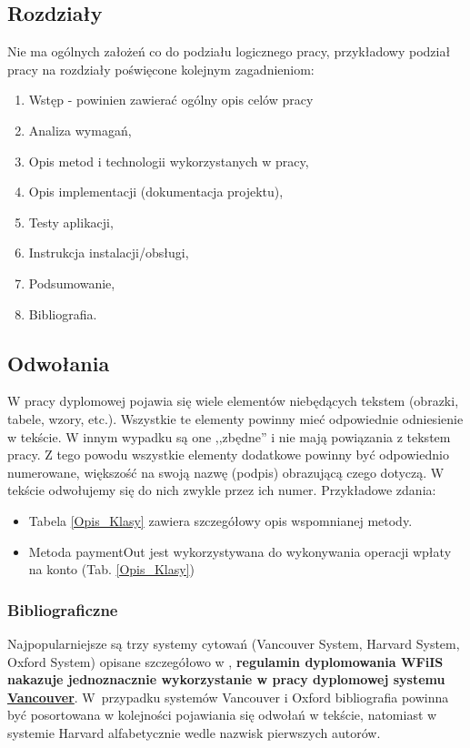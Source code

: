 \documentclass[12pt,a4paper]{article}
\begin{document}
\subsection{Rozdziały}
Nie ma ogólnych założeń co do podziału logicznego pracy, przykładowy podział pracy na rozdziały poświęcone kolejnym zagadnieniom:
\begin{enumerate}
\item Wstęp - powinien zawierać ogólny opis celów pracy
\item Analiza wymagań,
\item Opis metod i technologii wykorzystanych w pracy,
\item Opis implementacji (dokumentacja projektu),
\item Testy aplikacji,
\item Instrukcja instalacji/obsługi,
\item Podsumowanie,
\item Bibliografia.
\end{enumerate}

\subsection{Odwołania}

W pracy dyplomowej pojawia się wiele elementów niebędących tekstem (obrazki, tabele, wzory, etc.). Wszystkie te elementy powinny mieć odpowiednie odniesienie w tekście. W innym wypadku są one ,,zbędne'' i nie mają powiązania z tekstem pracy. Z tego powodu wszystkie elementy dodatkowe powinny być odpowiednio numerowane, większość na swoją nazwę (podpis) obrazującą czego dotyczą. W tekście odwołujemy się do nich zwykle przez ich numer. Przykładowe zdania: 
\begin{itemize}
\item Tabela \ref{Opis_Klasy} zawiera szczegółowy opis wspomnianej metody.
\item Metoda paymentOut jest wykorzystywana do wykonywania operacji wpłaty na konto (Tab. \ref{Opis_Klasy})
\end{itemize}

\subsubsection{Bibliograficzne}
Najpopularniejsze są trzy systemy cytowań (Vancouver System, Harvard System, Oxford System) opisane szczegółowo w \cite{Cytowanie}, {\bf regulamin dyplomowania WFiIS nakazuje jednoznacznie  wykorzystanie w pracy dyplomowej systemu \underline{Vancouver}}. W~przypadku systemów Vancouver i Oxford bibliografia powinna być posortowana w kolejności pojawiania się odwołań w tekście, natomiast w systemie Harvard alfabetycznie wedle nazwisk pierwszych autorów.
\end{document}

